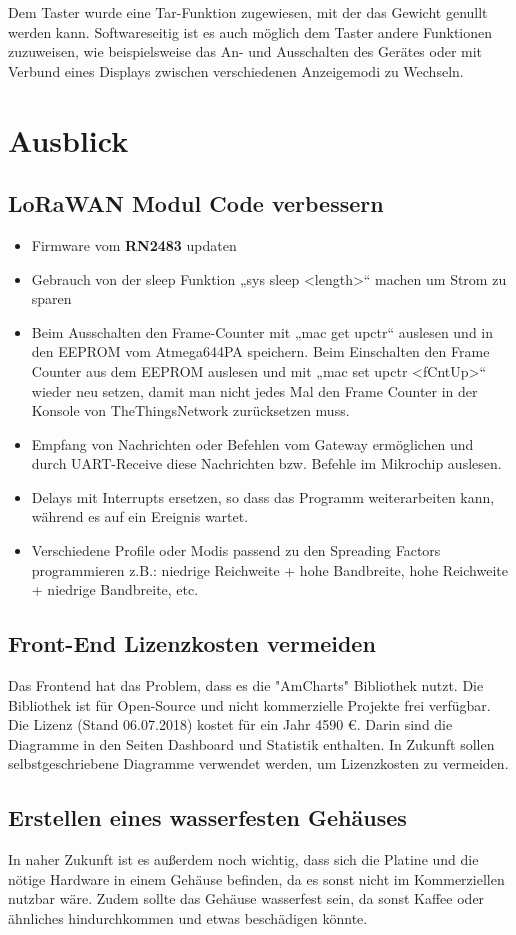 Dem Taster wurde eine Tar-Funktion zugewiesen, mit der das Gewicht genullt werden kann. Softwareseitig ist es auch möglich dem Taster andere Funktionen zuzuweisen, wie beispielsweise das An- und Ausschalten des Gerätes oder mit Verbund eines Displays zwischen verschiedenen Anzeigemodi zu Wechseln.

\chapter{Ausblick}
\section{LoRaWAN Modul Code verbessern}
\begin{itemize}
    \item Firmware vom \textbf{RN2483} updaten
    \item Gebrauch von der sleep Funktion „sys sleep <length>“ machen um Strom zu sparen
    \item Beim Ausschalten den Frame-Counter mit „mac get upctr“ auslesen und in den EEPROM vom Atmega644PA speichern. Beim Einschalten den Frame Counter aus dem EEPROM auslesen und mit „mac set upctr <fCntUp>“ wieder neu setzen, damit man nicht jedes Mal den Frame Counter in der Konsole von TheThingsNetwork zurücksetzen muss. 
    \item Empfang von Nachrichten oder Befehlen vom Gateway ermöglichen und durch UART-Receive diese Nachrichten bzw. Befehle im Mikrochip auslesen. 
    \item Delays mit Interrupts ersetzen, so dass das Programm weiterarbeiten kann, während es auf ein Ereignis wartet.
    \item Verschiedene Profile oder Modis passend zu den Spreading Factors programmieren z.B.: niedrige Reichweite + hohe Bandbreite, hohe Reichweite + niedrige Bandbreite, etc.
\end{itemize} 
\section{Front-End Lizenzkosten vermeiden}
Das Frontend hat das Problem, dass es die "AmCharts" Bibliothek nutzt. Die Bibliothek ist für Open-Source und nicht kommerzielle Projekte frei verfügbar. Die Lizenz (Stand 06.07.2018) kostet für ein Jahr 4590 \euro. Darin sind die Diagramme in den Seiten Dashboard und Statistik enthalten. In Zukunft sollen selbstgeschriebene Diagramme verwendet werden, um Lizenzkosten zu vermeiden.
\newpage
\section{Erstellen eines wasserfesten Gehäuses}
In naher Zukunft ist es außerdem noch wichtig, dass sich die Platine und die nötige Hardware in einem Gehäuse befinden, da es sonst nicht im Kommerziellen nutzbar wäre. Zudem sollte das Gehäuse wasserfest sein, da sonst Kaffee oder ähnliches hindurchkommen und etwas beschädigen könnte.\\

